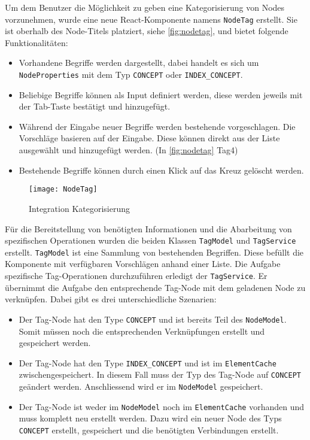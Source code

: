 Um dem Benutzer die Möglichkeit zu geben eine Kategorisierung von Nodes vorzunehmen, wurde eine neue \gls{React}-Komponente namens \texttt{NodeTag} erstellt. Sie ist oberhalb des Node-Titels platziert, siehe \autoref{fig:nodetag}, und bietet folgende Funktionalitäten:
\begin{itemize}
    \item Vorhandene Begriffe werden dargestellt, dabei handelt es sich um \texttt{NodeProperties} mit dem Typ \texttt{CONCEPT} oder \verb|INDEX_CONCEPT|.\\
    \item Beliebige Begriffe können als Input definiert werden, diese werden jeweils mit der Tab-Taste bestätigt und hinzugefügt.\\ 
    \item Während der Eingabe neuer Begriffe werden bestehende vorgeschlagen. Die Vorschläge basieren auf der Eingabe. Diese kön\-nen direkt aus der Liste ausgewählt und hinzugefügt werden. (In \autoref{fig:nodetag} Tag4)\\
    \item Bestehende Begriffe können durch einen Klick auf das Kreuz gelöscht werden.\\
\end{itemize}

    \begin{figure}[H]
    \centering
    \texttt{[image: NodeTag]}
    \caption{Integration Kategorisierung}
    \label{fig:nodetag}
    \end{figure}

Für die Bereitstellung von benötigten Informationen und die Abarbeitung von spezifischen Operationen wurden die beiden Klassen \texttt{TagModel} und \texttt{TagService} erstellt. \texttt{TagModel} ist eine Sammlung von bestehenden Begriffen. Diese befüllt die Komponente mit ver\-füg\-bar\-en Vorschlägen anhand einer Liste. Die Aufgabe spezifische Tag-\-Op\-er\-a\-tion\-en durchzuführen erledigt der \texttt{TagService}. Er übernimmt die Aufgabe den entsprechende Tag-Node mit dem geladenen Node zu verknüpfen. Dabei gibt es drei unterschiedliche Szenarien:
\begin{itemize}
    \item Der Tag-Node hat den Type \texttt{CONCEPT} und ist bereits Teil des \texttt{NodeModel}. Somit müssen noch die entsprechenden Ver\-knüpf\-ung\-en erstellt und gespeichert werden.
    \item Der Tag-Node hat den Type \verb|INDEX_CONCEPT| und ist im \texttt{Ele\-ment\-Cache} zwischengespeichert. In diesem Fall muss der Typ des Tag-Node auf \texttt{CONCEPT} geändert werden. Anschliessend wird er im \texttt{NodeModel} gespeichert. 
    \item Der Tag-Node ist weder im \texttt{NodeModel} noch im \texttt{ElementCache} vorhanden und muss komplett neu erstellt werden. Dazu wird ein neuer Node des Typs \texttt{CONCEPT} erstellt, gespeichert und die benötigten Verbindungen erstellt.
\end{itemize}
    

